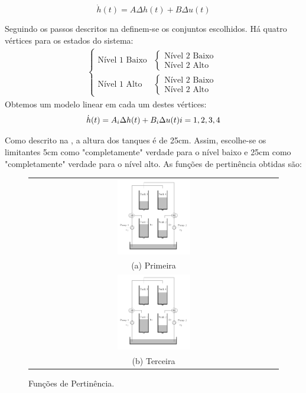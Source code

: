 	\begin{equation}
		\dot{h}(t) =  A \Delta h(t) +  B \Delta u(t)
	\end{equation}

Seguindo os passos descritos na  definem-se os conjuntos escolhidos. Há quatro vértices para os estados do sistema:
\begin{align}
	\begin{cases}
		\text{Nível 1 Baixo}
		&\begin{cases}
			\text{Nível 2 Baixo}\\
			\text{Nível 2 Alto}
		\end{cases}	\\
		\text{Nível 1 Alto}
		&\begin{cases}
			\text{Nível 2 Baixo}\\
			\text{Nível 2 Alto}
		\end{cases}
	\end{cases}
\end{align}
Obtemos um modelo linear em cada um destes vértices:
	\begin{equation}
	\dot{h}(t) =  A_i \Delta h(t) +  B_i \Delta u(t) \\
	i = 1,2,3,4
	\end{equation}


Como descrito na , a altura dos tanques é de 25cm. Assim, escolhe-se os limitantes 5cm como "completamente" verdade para o nível baixo e  25cm como "completamente" verdade para o nível alto. As funções de pertinência obtidas são:

\begin{figure}[H]
	\centering
	\begin{tabular}{c}
		\includegraphics[width=0.3\textwidth,keepaspectratio]{img/4tank.png}\\
		(a) Primeira\\
		\includegraphics[width=0.3\textwidth,keepaspectratio]{img/4tank.png} \\
		(b) Terceira
	\end{tabular}
	\caption{\label{figPertMod} Funções de Pertinência.}
\end{figure}

